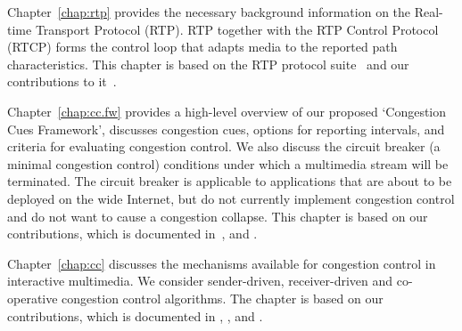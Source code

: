 
Chapter~\ref{chap:rtp} provides the necessary background information on the 
Real-time Transport Protocol (RTP). RTP together with the RTP Control Protocol (RTCP)
forms the control loop that adapts media to the reported path characteristics.
This chapter is based on the RTP protocol suite~\cite{rfc3550, rfc4585,
rfc3611, rfc5104, rfc5506} and our contributions to
it~\cite{rfc7097, rfc7005, draft.xr.bytes.discarded, draft.xr.post.repair}.


Chapter~\ref{chap:cc.fw} provides a high-level overview of our proposed
`Congestion Cues Framework', discusses congestion cues, options for reporting
intervals, and criteria for evaluating congestion control. We also discuss the
circuit breaker (a minimal congestion control) conditions under which a
multimedia stream will be terminated. The circuit breaker is applicable to
applications that are about to be deployed on the wide Internet, but do not
currently implement congestion control and do not want to cause a congestion
collapse. This chapter is based on our contributions, which is documented
in~\cite{Singh:control.loops.api, draft.rmcat.app.interaction,
draft.rmcat.evaluate, Singh:PhDFw, draft.rtp.cb}, and .



Chapter~\ref{chap:cc} discusses the mechanisms available for congestion
control in interactive multimedia. We consider sender-driven, receiver-driven
and co-operative congestion control algorithms. The chapter is based on our
contributions, which is documented in , ,
\cite{singh:2010.thesis} and .


